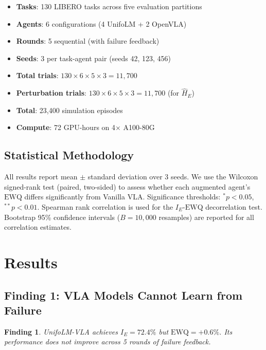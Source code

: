 ﻿\documentclass{article}
\newtheorem{finding}{Finding}
\newcommand{\EWQ}{\mathrm{EWQ}}
\begin{document}
\begin{itemize}[leftmargin=*,itemsep=1pt]
    \item \textbf{Tasks}: 130 LIBERO tasks across five evaluation partitions
    \item \textbf{Agents}: 6 configurations (4 UnifoLM + 2 OpenVLA)
    \item \textbf{Rounds}: 5 sequential (with failure feedback)
    \item \textbf{Seeds}: 3 per task-agent pair (seeds 42, 123, 456)
    \item \textbf{Total trials}: $130 \times 6 \times 5 \times 3 = 11{,}700$
    \item \textbf{Perturbation trials}: $130 \times 6 \times 5 \times 3 = 11{,}700$ (for $\hat{H}_E$)
    \item \textbf{Total}: 23{,}400 simulation episodes
    \item \textbf{Compute}: 72 GPU-hours on 4$\times$ A100-80G
\end{itemize}

\subsection{Statistical Methodology}

All results report mean $\pm$ standard deviation over 3 seeds.
We use the Wilcoxon signed-rank test (paired, two-sided) to assess
whether each augmented agent's $\EWQ$ differs significantly from
Vanilla VLA. Significance thresholds: $^*p{<}0.05$, $^{**}p{<}0.01$.
Spearman rank correlation is used for the $I_E$-$\EWQ$ decorrelation
test. Bootstrap 95\% confidence intervals ($B{=}10{,}000$ resamples)
are reported for all correlation estimates.

\section{Results}
\label{sec:results}

\subsection{Finding 1: VLA Models Cannot Learn from Failure}

\begin{finding}
UnifoLM-VLA achieves $I_E = 72.4\%$ but $\EWQ = +0.6\%$.
Its performance does not improve across 5 rounds of failure feedback.
\end{finding}
\end{document}
